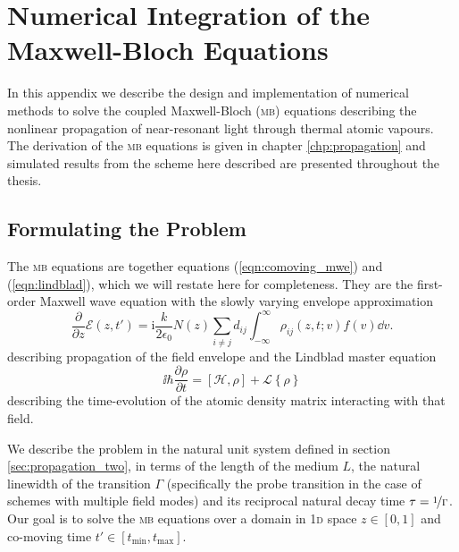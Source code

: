 \chapter[Numerical Integration of the Maxwell-Bloch Equations]
  {Numerical Integration of the\\ Maxwell-Bloch Equations}
  \label{apx:mb_eqns}


    In this appendix we describe the design and implementation of numerical
    methods to solve the coupled Maxwell-Bloch (\textsc{mb}) equations
    describing the nonlinear propagation of near-resonant light through thermal
    atomic vapours. The derivation of the \textsc{mb} equations is given in
    chapter \ref{chp:propagation} and simulated results from the scheme here
    described are presented throughout the thesis.

  \section{Formulating the Problem}

    The \textsc{mb} equations are together equations (\ref{eqn:comoving_mwe})
    and (\ref{eqn:lindblad}), which we will restate here for completeness. They
    are the first-order Maxwell wave equation with the slowly varying envelope
    approximation
    \begin{equation*}
      \frac{\partial}{\partial z} \mathcal{E}(z,t') = 
        \mathrm{i} \frac{k}{2 \epsilon_0}
        N(z) \sum_{i \ne j} d_{ij} \int_{-\infty}^{\infty} 
          \rho_{ij}(z,t; v) f(v) {\dd v}. 
    \end{equation*}
    describing propagation of the field envelope and the Lindblad master
    equation
    \begin{equation*}
      \ii \hbar \frac{\partial \rho}{\partial t} = [\mathcal{H}, \rho] + 
        \mathcal{L}\left\{ \rho \right\}
    \end{equation*}
    describing the time-evolution of the atomic density matrix interacting with
    that field.

    We describe the problem in the natural unit system defined in section
    \ref{sec:propagation_two}, in terms of the length of the medium $L$, the
    natural linewidth of the transition $\Gamma$ (specifically the probe
    transition in the case of schemes with multiple field modes) and its
    reciprocal natural decay time $\tau = \nicefrac{1}{\Gamma}$. Our goal is to
    solve the \textsc{mb} equations over a domain in \textsc{1d} space $z \in
    [0, 1]$ and co-moving time $t' \in [t_{\mathrm{min}}, t_{\mathrm{max}}]$.


